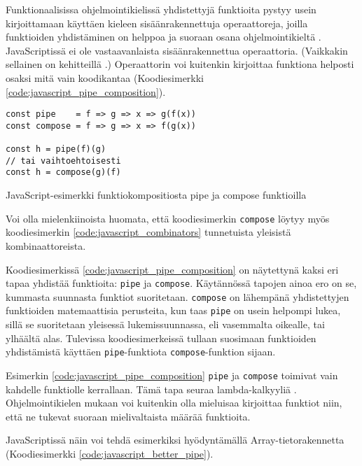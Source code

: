 Funktionaalisissa ohjelmointikielissä yhdistettyjä funktioita pystyy usein kirjoittamaan käyttäen kieleen sisäänrakennettuja operaattoreja, joilla funktioiden yhdistäminen on helppoa ja suoraan osana ohjelmointikieltä \cite{fsharpcomposition,haskellcomposition}.
JavaScriptissä ei ole vastaavanlaista sisäänrakennettua operaattoria.
(Vaikkakin sellainen on kehitteillä \cite{tc39_pipeline_operator}.)
Operaattorin voi kuitenkin kirjoittaa funktiona helposti osaksi mitä vain koodikantaa (Koodiesimerkki \ref{code:javascript_pipe_composition}).

\begin{code}
    \begin{verbatim}
const pipe    = f => g => x => g(f(x))
const compose = f => g => x => f(g(x))

const h = pipe(f)(g)
// tai vaihtoehtoisesti
const h = compose(g)(f)
\end{verbatim}
    \caption{JavaScript-esimerkki funktiokompositiosta pipe ja compose funktioilla}
    \label{code:javascript_pipe_composition}
\end{code}

Voi olla mielenkiinoista huomata, että koodiesimerkin \texttt{compose} löytyy myös koodiesimerkin \ref{code:javascript_combinators} tunnetuista yleisistä kombinaattoreista.

Koodiesimerkissä \ref{code:javascript_pipe_composition} on näytettynä kaksi eri tapaa yhdistää funktioita: \texttt{pipe} ja \texttt{compose}. Käytännössä tapojen ainoa ero on se, kummasta suunnasta funktiot suoritetaan. \texttt{compose} on lähempänä yhdistettyjen funktioiden matemaattisia perusteita, kun taas \texttt{pipe} on usein helpompi lukea, sillä se suoritetaan yleisessä lukemissuunnassa, eli vasemmalta oikealle, tai ylhäältä alas. Tulevissa koodiesimerkeissä tullaan suosimaan funktioiden yhdistämistä käyttäen \texttt{pipe}-funktiota \texttt{compose}-funktion sijaan. \citep{whyprefercompose}

Esimerkin \ref{code:javascript_pipe_composition} \texttt{pipe} ja \texttt{compose} toimivat vain kahdelle funktiolle kerrallaan. Tämä tapa seuraa lambda-kalkyyliä \cite{computerphile_lambda}. Ohjelmointikielen mukaan voi kuitenkin olla mieluisaa kirjoittaa funktiot niin, että ne tukevat suoraan mielivaltaista määrää funktioita.

JavaScriptissä näin voi tehdä esimerkiksi hyödyntämällä Array-tietorakennetta (Koodiesimerkki \ref{code:javascript_better_pipe}).

